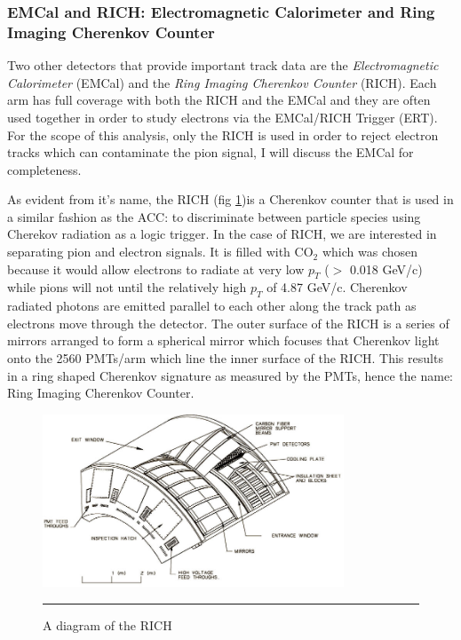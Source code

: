 \subsubsection{EMCal and RICH: Electromagnetic Calorimeter and Ring Imaging Cherenkov Counter}
Two other detectors that provide important track data are the \textit{Electromagnetic Calorimeter} (EMCal) and the \textit{Ring Imaging Cherenkov Counter} (RICH). Each arm has full coverage with both the RICH and the EMCal and they are often used together in order to study electrons via the EMCal/RICH Trigger (ERT). For the scope of this analysis, only the RICH is used in order to reject electron tracks which can contaminate the pion signal, I will discuss the EMCal for completeness.

As evident from it's name, the RICH (fig \ref{fig:RICHdiagram})is a Cherenkov counter that is used in a similar fashion as the ACC: to discriminate between particle species using Cherekov radiation as a logic trigger. In the case of RICH, we are interested in separating pion and electron signals. It is filled with CO$_2$ which was chosen because it would allow electrons to radiate at very low $p_T$ ($>$ 0.018 GeV/c) while pions will not until the relatively high $p_T$ of 4.87 GeV/c. Cherenkov radiated photons are emitted parallel to each other along the track path as electrons move through the detector. The outer surface of the RICH is a series of mirrors arranged to form a spherical mirror which focuses that Cherenkov light onto the 2560 PMTs/arm which line the inner surface of the RICH. This results in a ring shaped Cherenkov signature as measured by the PMTs, hence the name: Ring Imaging Cherenkov Counter. 

\begin{figure}[h!]
  \centering
    \includegraphics[width=0.8\textwidth]{Figures/RICHdiagram.jpg}
    \rule{35em}{0.5pt}
  \caption[A diagram of the RICH]{A diagram of the RICH}
  \label{fig:RICHdiagram}
\end{figure}

